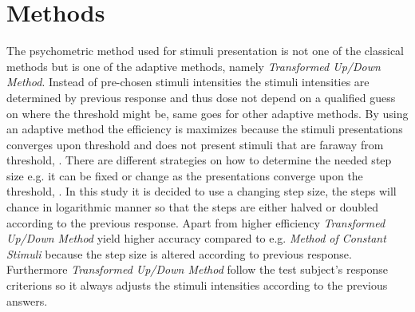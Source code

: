 \section*{Methods}
\label{Methods}
%
The psychometric method used for stimuli presentation is not one of the classical methods but is one of the adaptive methods, namely \textit{Transformed Up/Down Method}. Instead of pre-chosen stimuli intensities the stimuli intensities are determined by previous response and thus dose not depend on a qualified guess on where the threshold might be, same goes for other adaptive methods. By using an adaptive method the efficiency is maximizes because the stimuli presentations converges upon threshold and does not present stimuli that are faraway from threshold, \parencite[p. 287]{PDF:Hearing}. There are different strategies on how to determine the needed step size e.g. it can be fixed or change as the presentations converge upon the threshold, \parencite[p. 22]{PDF:Psychoacoustic}. In this study it is decided to use a changing step size, the steps will chance in logarithmic manner so that the steps are either halved or doubled according to the previous response. Apart from higher efficiency \textit{Transformed Up/Down Method} yield higher accuracy compared to e.g. \textit{Method of Constant Stimuli} because the step size is altered according to previous response. Furthermore \textit{Transformed Up/Down Method} follow the test subject's response criterions so it always adjusts the stimuli intensities according to the previous answers.  


